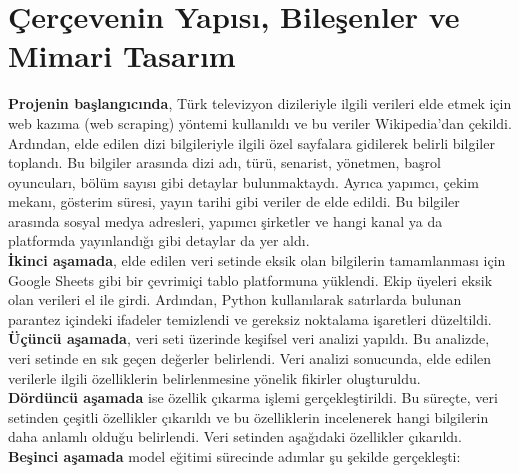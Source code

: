 \section{Çerçevenin Yapısı, Bileşenler ve Mimari Tasarım}

\indent \textbf{Projenin başlangıcında}, Türk televizyon dizileriyle ilgili verileri elde etmek için web kazıma (web scraping) yöntemi kullanıldı ve bu veriler Wikipedia'dan çekildi. Ardından, elde edilen dizi bilgileriyle ilgili özel sayfalara gidilerek belirli bilgiler toplandı. Bu bilgiler arasında dizi adı, türü, senarist, yönetmen, başrol oyuncuları, bölüm sayısı gibi detaylar bulunmaktaydı. Ayrıca yapımcı, çekim mekanı, gösterim süresi, yayın tarihi gibi veriler de elde edildi. Bu bilgiler arasında sosyal medya adresleri, yapımcı şirketler ve hangi kanal ya da platformda yayınlandığı gibi detaylar da yer aldı. \\

\indent \textbf{İkinci aşamada}, elde edilen veri setinde eksik olan bilgilerin tamamlanması için Google Sheets gibi bir çevrimiçi tablo platformuna yüklendi. Ekip üyeleri eksik olan verileri el ile girdi. Ardından, Python kullanılarak satırlarda bulunan parantez içindeki ifadeler temizlendi ve gereksiz noktalama işaretleri düzeltildi. \\

\indent \textbf{Üçüncü aşamada}, veri seti üzerinde keşifsel veri analizi yapıldı. Bu analizde, veri setinde en sık geçen değerler belirlendi. Veri analizi sonucunda, elde edilen verilerle ilgili özelliklerin belirlenmesine yönelik fikirler oluşturuldu. \\

\indent \textbf{Dördüncü aşamada} ise özellik çıkarma işlemi gerçekleştirildi. Bu süreçte, veri setinden çeşitli özellikler çıkarıldı ve bu özelliklerin incelenerek hangi bilgilerin daha anlamlı olduğu belirlendi. Veri setinden aşağıdaki özellikler çıkarıldı. \\

\indent \textbf{Beşinci aşamada} model eğitimi sürecinde adımlar şu şekilde gerçekleşti:

